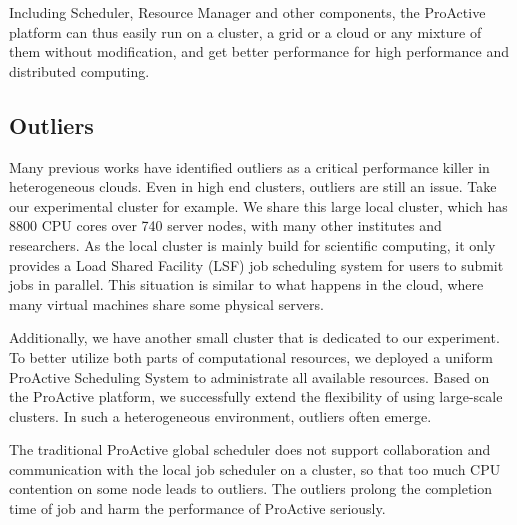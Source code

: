 Including Scheduler, Resource Manager and other components, the ProActive platform can thus easily run on a cluster, a grid or a cloud or any mixture of them without modification, and get better performance for high performance and distributed computing.

\subsection{Outliers}

Many previous works have identified outliers as a critical performance killer in heterogeneous clouds. Even in high end clusters, outliers are still an issue. Take our experimental cluster for example. We share this large local cluster, which has 8800 CPU cores over 740 server nodes, with many other institutes and researchers. As the local cluster is mainly build for scientific computing, it only provides a Load Shared Facility (LSF) job scheduling system for users to submit jobs in parallel. This situation is similar to what happens in the cloud, where many virtual machines share some physical servers.

Additionally, we have another small cluster that is dedicated to our experiment. To better utilize both parts of computational resources, we deployed a uniform ProActive Scheduling System to administrate all available resources. Based on the ProActive platform, we successfully extend the flexibility of using large-scale clusters. In such a heterogeneous environment, outliers often emerge.

The traditional ProActive global scheduler does not support collaboration and communication with the local job scheduler on a cluster, so that too much CPU contention on some node leads to outliers. The outliers prolong the completion time of job and harm the performance of ProActive seriously.
